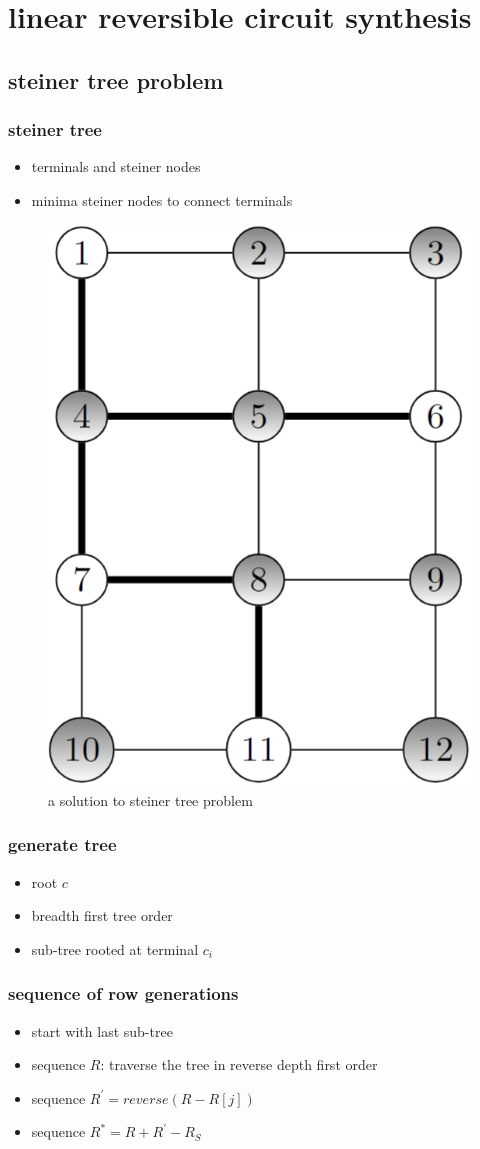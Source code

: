 \section{linear reversible circuit synthesis}
\subsection{steiner tree problem}
\begin{frame}
    \frametitle{steiner tree}
    \begin{itemize}
        \item terminals and steiner nodes
        \item minima steiner nodes to connect terminals
    \end{itemize}
    \begin{figure}
        \centering
        \includegraphics[width=.2\linewidth]{figure/steiner.png}
        \caption{a solution to steiner tree problem\cite{Nash_2020}}
    \end{figure}
\end{frame}
\begin{frame}
    \frametitle{generate tree}
    \begin{itemize}
        \item root $c$
        \item breadth first tree order 
        \item sub-tree rooted at terminal $c_i$
    \end{itemize}
\end{frame}
\begin{frame}
    \frametitle{sequence of row generations}
    \begin{itemize}
        \item start with last sub-tree
        \item sequence $R$: traverse the tree in reverse depth first order
        \item sequence $R^{'}=reverse(R-R[j])$
        \item sequence $R^{*}=R+R^{'}-R_{S}$
    \end{itemize}
\end{frame}

